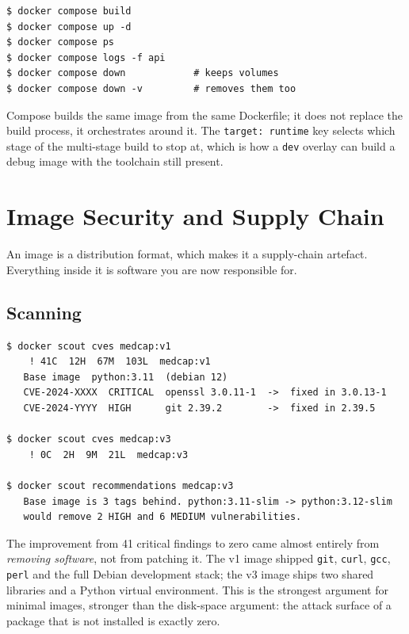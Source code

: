 \documentclass[10pt,a4paper]{article}
\begin{document}
\begin{lstlisting}[style=shell]
$ docker compose build
$ docker compose up -d
$ docker compose ps
$ docker compose logs -f api
$ docker compose down            # keeps volumes
$ docker compose down -v         # removes them too
\end{lstlisting}

Compose builds the same image from the same Dockerfile; it does not
replace the build process, it orchestrates around it. The \texttt{target:
runtime} key selects which stage of the multi-stage build to stop at,
which is how a \texttt{dev} overlay can build a debug image with the
toolchain still present.


\section{Image Security and Supply Chain}

An image is a distribution format, which makes it a supply-chain
artefact. Everything inside it is software you are now responsible for.

\subsection{Scanning}

\begin{lstlisting}[style=shell]
$ docker scout cves medcap:v1
    ! 41C  12H  67M  103L  medcap:v1
   Base image  python:3.11  (debian 12)
   CVE-2024-XXXX  CRITICAL  openssl 3.0.11-1  ->  fixed in 3.0.13-1
   CVE-2024-YYYY  HIGH      git 2.39.2        ->  fixed in 2.39.5

$ docker scout cves medcap:v3
    ! 0C  2H  9M  21L  medcap:v3

$ docker scout recommendations medcap:v3
   Base image is 3 tags behind. python:3.11-slim -> python:3.12-slim
   would remove 2 HIGH and 6 MEDIUM vulnerabilities.
\end{lstlisting}

The improvement from 41 critical findings to zero came almost entirely
from \emph{removing software}, not from patching it. The v1 image
shipped \texttt{git}, \texttt{curl}, \texttt{gcc}, \texttt{perl} and the
full Debian development stack; the v3 image ships two shared libraries
and a Python virtual environment. This is the strongest argument for
minimal images, stronger than the disk-space argument: the attack
surface of a package that is not installed is exactly zero.
\end{document}
